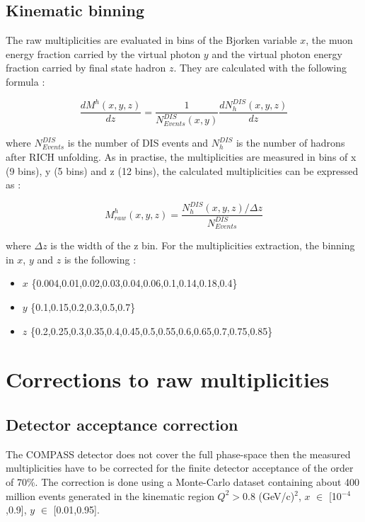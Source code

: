 \documentclass[letterpaper,12pt]{article}
\begin{document}
\subsection{Kinematic binning}

The raw multiplicities are evaluated in bins of the Bjorken variable $x$, the muon energy fraction carried
by the virtual photon $y$ and the virtual photon energy fraction carried by final state hadron $z$. They
are calculated with the following formula :

\begin{equation}
  \frac{dM^h(x,y,z)}{dz}=\frac{1}{N^{DIS}_{Events}(x,y)}\frac{dN^{DIS}_{h}(x,y,z)}{dz}
\end{equation}

where $N^{DIS}_{Events}$ is the number of DIS events and $N^{DIS}_{h}$ is the number of
hadrons after RICH unfolding. As in practise, the multiplicities are measured in bins of
x (9 bins), y (5 bins) and z (12 bins), the calculated multiplicities can be expressed as :

\begin{equation}
  M^h_{raw}(x,y,z) = \frac{N^{DIS}_{h}(x,y,z)/\Delta z}{N^{DIS}_{Events}}
\end{equation}

where $\Delta z$ is the width of the z bin. For the multiplicities extraction, the binning in
$x$, $y$ and $z$ is the following :

\begin{itemize}
  \item $x$ \{0.004,0.01,0.02,0.03,0.04,0.06,0.1,0.14,0.18,0.4\}
  \item $y$ \{0.1,0.15,0.2,0.3,0.5,0.7\}
  \item $z$ \{0.2,0.25,0.3,0.35,0.4,0.45,0.5,0.55,0.6,0.65,0.7,0.75,0.85\}
\end{itemize}

\section{Corrections to raw multiplicities} \label{Cor}

\subsection{Detector acceptance correction}

The COMPASS detector does not cover the full phase-space then the measured multiplicities have
to be corrected for the finite detector acceptance of the order of 70\%. The correction is
done using a Monte-Carlo dataset containing about 400 million events generated in the kinematic
region $Q^2 > 0.8$ (GeV/c)$^2$, $x$ $\in$ [10$^{-4}$,0.9], $y$ $\in$ [0.01,0.95].
\end{document}
